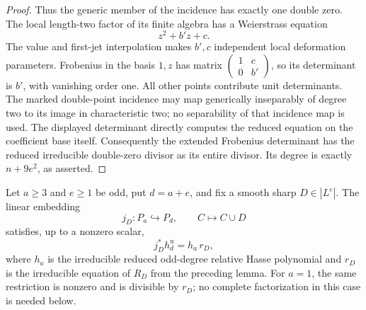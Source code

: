 \begin{proof}
Thus the generic member of the incidence has exactly one
double zero. The local length-two factor of its finite algebra
has a Weierstrass equation
\[
                             z^2+b'z+c.
\]
The value and first-jet interpolation makes $b',c$ independent
local deformation parameters. Frobenius in the basis $1,z$
has matrix $\left(\begin{smallmatrix}1&c\\0&b'\end{smallmatrix}\right)$,
so its determinant is $b'$, with vanishing order one.
All other points contribute unit determinants.
The marked double-point incidence may map generically inseparably
of degree two to its image in characteristic two; no separability
of that incidence map is used. The displayed determinant directly
computes the reduced equation on the coefficient base itself.
Consequently the extended Frobenius determinant has the reduced
irreducible double-zero divisor as its entire divisor. Its
degree is exactly $n+9e^2$, as asserted.
\end{proof}

\begin{lemma}
\label{lem:ss-even-boundary-factorization-candidate}
Let $a\ge3$ and $e\ge1$ be odd, put $d=a+e$, and fix a smooth
sharp $D\in|L^e|$. The linear embedding
\[
 j_D:P_a\hookrightarrow P_d,\qquad C\longmapsto C\cup D
\]
satisfies, up to a nonzero scalar,
\[
                         j_D^*h_d^{\mathrm u}=h_a\,r_D,
\]
where $h_a$ is the irreducible reduced odd-degree relative
Hasse polynomial and $r_D$ is the irreducible equation of
$R_D$ from the preceding lemma.
For $a=1$, the same restriction is nonzero and is divisible
by $r_D$; no complete factorization in this case is needed below.
\end{lemma}

